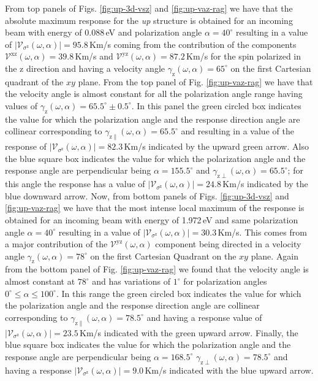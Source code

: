 \documentclass[prb,11pt,tightenlines,twocolumn,aps]{revtex4-1}
\begin{document}
From top panels of Figs. \ref{fig:up-3d-vsz} and \ref{fig:up-vaz-rag} we have
that the absolute maximum response for the \emph{up} structure is obtained for
an incoming beam with energy of 0.088\,eV and polarization angle
$\alpha=40^{\circ}$ resulting in a value of
$|\mathcal{V}_{\sigma^{\mathrm{z}}}(\omega,\alpha)|=95.8$\,Km/s coming from the
contribution of the components
$\mathcal{V}^{\mathrm{xz}}(\omega,\alpha)=39.8$\,Km/s and
$\mathcal{V}^{\mathrm{yz}}(\omega,\alpha)=87.2$\,Km/s for the spin polarized in
the $\mathrm{z}$ direction and having a velocity angle
$\gamma_{\mathrm{z}}(\omega,\alpha)=65^{\circ}$ on the first Cartesian quadrant
of the $xy$ plane.
% 
{\color{red} From the top panel of Fig. \ref{fig:up-vaz-rag} we have that the
velocity angle is almost constant for all the polarization angle range having
values of $\gamma_{\mathrm{z}}(\omega,\alpha) = 65.5^{\circ} \pm 0.5^{\circ}$.
In this panel the green circled box indicates the value for which the
polarization angle and the response direction angle are collinear corresponding
to $\gamma_{\mathrm{z}\parallel}(\omega,\alpha) = 65.5^{\circ}$ and resulting in
a value of the response of $|\mathcal{V}_{\sigma^{\mathrm{z}}}(\omega,\alpha)| =
82.3$\,Km/s indicated by the upward green arrow.
% 
Also the blue square box indicates the value for which the polarization angle
and the response angle are perpendicular being $\alpha=155.5^{\circ}$ and
$\gamma_{\mathrm{z}\perp}(\omega,\alpha)=65.5^{\circ}$; for this angle the
response has a value of $|\mathcal{V}_{\sigma^{\mathrm{z}}}(\omega,\alpha)| =
24.8$\,Km/s indicated by the blue downward arrow.}
% 
Now, from bottom panels of Figs. \ref{fig:up-3d-vsz} and \ref{fig:up-vaz-rag} we
have that the most intense local maximum of the response is obtained for an
incoming beam with energy of 1.972\,eV and same polarization angle
$\alpha=40^{\circ}$ resulting in a value of
$|\mathcal{V}_{\sigma^{\mathrm{z}}}(\omega,\alpha)|=30.3$\,Km/s. This comes from
a major contribution of the $\mathcal{V}^{\mathrm{yz}}(\omega,\alpha)$ component
being directed in a velocity angle $\gamma_{\mathrm{z}}(\omega,\alpha) =
78^{\circ}$ on the first Cartesian Quadrant on the $xy$ plane.
% 
{\color{red} Again from the bottom panel of Fig. \ref{fig:up-vaz-rag} we found
that the velocity angle is almost constant at $78^{\circ}$ and has variations of
$1^{\circ}$ for polarization angles $0^{\circ} \leq \alpha \leq 100^{\circ}$. In
this range the green circled box indicates the value for which the polarization
angle and the response direction angle are collinear corresponding to
$\gamma_{\mathrm{z}\parallel}(\omega,\alpha) = 78.5^{\circ}$ and having a
response value of $|\mathcal{V}_{\sigma^{\mathrm{z}}}(\omega,\alpha)| =
23.5$\,Km/s indicated with the green upward arrow.
% 
Finally, the blue square box indicates the value for which the polarization
angle and the response angle are perpendicular being $\alpha=168.5^{\circ}$
$\gamma_{\mathrm{z}\perp}(\omega,\alpha) = 78.5^{\circ}$ and having a response
$|\mathcal{V}_{\sigma^{\mathrm{z}}}(\omega,\alpha)|=9.0$\,Km/s indicated with
the blue upward arrow.}
\end{document}
